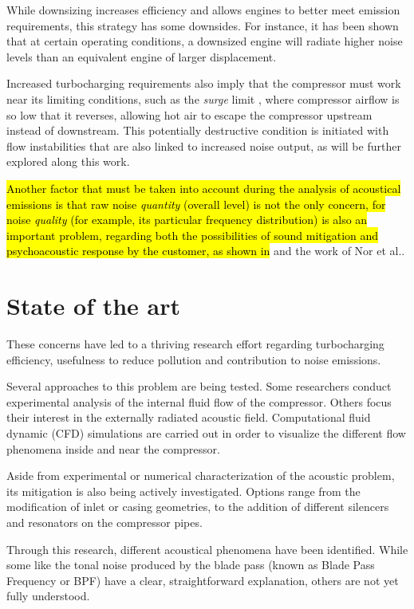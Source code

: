 While downsizing increases efficiency and allows engines to better meet emission requirements, this strategy has some downsides. For instance, it has been shown \cite{stoffels2003nvh} that at certain operating conditions, a downsized engine will radiate higher noise levels than an equivalent engine of larger displacement.

Increased turbocharging requirements also imply that the compressor must work near its limiting conditions, such as the \emph{surge} limit \cite{teng2009investigation}, where compressor airflow is so low that it reverses, allowing hot air to escape the compressor upstream instead of downstream. This potentially destructive condition is initiated with flow instabilities that are also linked to increased noise output, as will be further explored along this work.

\hl{Another factor that must be taken into account during the analysis of acoustical emissions is that raw noise \emph{quantity} (overall level) is not the only concern, for noise \emph{quality} (for example, its particular frequency distribution) is also an important problem, regarding both the possibilities of sound  mitigation and psychoacoustic response by the customer, as shown in} \cite{brizon2012combining} and the work of Nor et al.\cite{nor2008index}.

\section{State of the art}

These concerns have led to a thriving research effort regarding turbocharging efficiency, usefulness to reduce pollution and contribution to noise emissions.

Several approaches to this problem are being tested. Some researchers conduct experimental analysis of the internal fluid flow of the compressor. Others focus their interest in the externally radiated acoustic field. Computational fluid dynamic (CFD) simulations are carried out in order to visualize the different flow phenomena inside and near the compressor.

Aside from experimental or numerical characterization of the acoustic problem, its mitigation is also being actively investigated. Options range from the modification of inlet or casing geometries, to the addition of different silencers and resonators on the compressor pipes.

Through this research, different acoustical phenomena have been identified. While some like the tonal noise produced by the blade pass (known as Blade Pass Frequency or BPF) have a clear, straightforward explanation, others are not yet fully understood.

